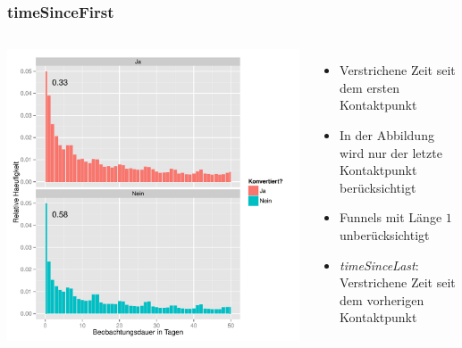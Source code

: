 \begin{frame}\frametitle{timeSinceFirst}
	\begin{columns}
		\column{7cm}
			\includegraphics[scale=0.39]{timeSinceFirst_Last.pdf}
		\column{4cm}
			\begin{itemize}
				\item Verstrichene Zeit seit dem ersten Kontaktpunkt
				\item In der Abbildung wird nur der letzte Kontaktpunkt berücksichtigt
				\item Funnels mit Länge $1$ unberücksichtigt
				\item \textit{timeSinceLast}: Verstrichene Zeit seit dem vorherigen Kontaktpunkt
			\end{itemize}
	\end{columns}
\end{frame}


